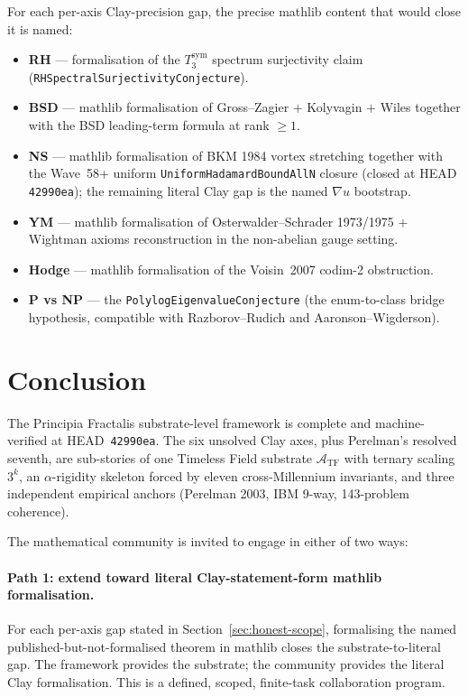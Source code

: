 \documentclass[11pt,a4paper]{article}
\theoremstyle{definition}
\theoremstyle{remark}
\newcommand{\TF}{\mathcal{A}_{\mathrm{TF}}}
\newcommand{\lean}[1]{\texttt{\small #1}}
\begin{document}
For each per-axis Clay-precision gap, the precise mathlib content
that would close it is named:

\begin{itemize}
\item \textbf{RH} --- formalisation of the
$T_{3}^{\mathrm{sym}}$ spectrum surjectivity claim
(\lean{RHSpectralSurjectivityConjecture}).
\item \textbf{BSD} --- mathlib formalisation of Gross--Zagier
$+$ Kolyvagin $+$ Wiles together with the BSD leading-term
formula at rank $\ge 1$.
\item \textbf{NS} --- mathlib formalisation of BKM 1984 vortex
stretching together with the Wave~58+ uniform
\lean{UniformHadamardBoundAllN} closure (closed at HEAD
\texttt{42990ea}); the remaining literal Clay gap is the named
$\nabla u$ bootstrap.
\item \textbf{YM} --- mathlib formalisation of
Osterwalder--Schrader 1973/1975 $+$ Wightman axioms
reconstruction in the non-abelian gauge setting.
\item \textbf{Hodge} --- mathlib formalisation of the Voisin~2007
codim-2 obstruction.
\item \textbf{P vs NP} --- the
\lean{PolylogEigenvalueConjecture} (the enum-to-class bridge
hypothesis, compatible with Razborov--Rudich and
Aaronson--Wigderson).
\end{itemize}

\section{Conclusion}
\label{sec:conclusion}

The Principia Fractalis substrate-level framework is complete and
machine-verified at HEAD~\texttt{42990ea}. The six unsolved Clay
axes, plus Perelman's resolved seventh, are sub-stories of one
Timeless Field substrate $\TF$ with ternary scaling $3^{k}$, an
$\alpha$-rigidity skeleton forced by eleven cross-Millennium
invariants, and three independent empirical anchors (Perelman 2003,
IBM 9-way, 143-problem coherence).

The mathematical community is invited to engage in either of two
ways:

\paragraph{Path 1: extend toward literal Clay-statement-form mathlib formalisation.}
For each per-axis gap stated in Section~\ref{sec:honest-scope},
formalising the named published-but-not-formalised theorem in
mathlib closes the substrate-to-literal gap. The framework
provides the substrate; the community provides the literal Clay
formalisation. This is a defined, scoped, finite-task collaboration
program.
\end{document}
